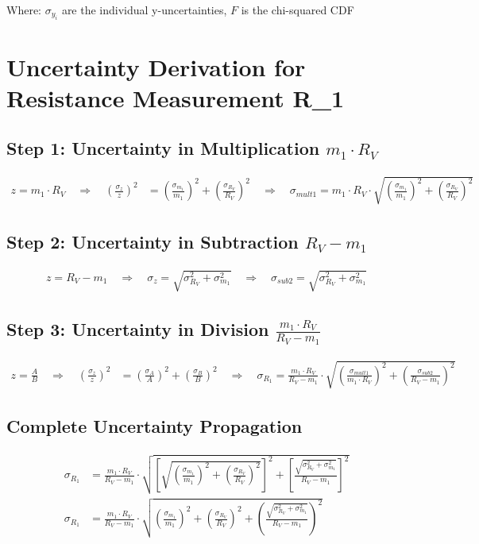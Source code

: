 \documentclass{article} %
\begin{document}
Where: $\sigma_{y_i}$ are the individual y-uncertainties, $F$ is the chi-squared CDF

\newpage

\section{Uncertainty Derivation for Resistance Measurement R\_1}
\label{app:d_R1_uncertainty}

\subsection*{Step 1: Uncertainty in Multiplication $m_1 \cdot R_V$}
\begin{align*}
z = m_1 \cdot R_V \quad \Rightarrow \quad \left(\frac{\sigma_z}{z}\right)^2 &= \left(\frac{\sigma_{m_1}}{m_1}\right)^2 + \left(\frac{\sigma_{R_V}}{R_V}\right)^2 \quad \Rightarrow \quad \sigma_{mult1} = m_1 \cdot R_V \cdot \sqrt{\left(\frac{\sigma_{m_1}}{m_1}\right)^2 + \left(\frac{\sigma_{R_V}}{R_V}\right)^2}
\end{align*}

\subsection*{Step 2: Uncertainty in Subtraction $R_V - m_1$}
\begin{align*}
z = R_V - m_1 \quad \Rightarrow \quad \sigma_z = \sqrt{\sigma_{R_V}^2 + \sigma_{m_1}^2} \quad \Rightarrow \quad \sigma_{sub2} = \sqrt{\sigma_{R_V}^2 + \sigma_{m_1}^2}
\end{align*}

\subsection*{Step 3: Uncertainty in Division $\frac{m_1 \cdot R_V}{R_V - m_1}$}
\begin{align*}
z = \frac{A}{B} \quad \Rightarrow \quad \left(\frac{\sigma_z}{z}\right)^2 &= \left(\frac{\sigma_A}{A}\right)^2 + \left(\frac{\sigma_B}{B}\right)^2 \quad \Rightarrow \quad \sigma_{R_1} = \frac{m_1 \cdot R_V}{R_V - m_1} \cdot \sqrt{\left(\frac{\sigma_{mult1}}{m_1 \cdot R_V}\right)^2 + \left(\frac{\sigma_{sub2}}{R_V - m_1}\right)^2}
\end{align*}

\subsection*{Complete Uncertainty Propagation}
\begin{align*}
\sigma_{R_1} &= \frac{m_1 \cdot R_V}{R_V - m_1} \cdot \sqrt{\left[\sqrt{\left(\frac{\sigma_{m_1}}{m_1}\right)^2 + \left(\frac{\sigma_{R_V}}{R_V}\right)^2}\right]^2 + \left[\frac{\sqrt{\sigma_{R_V}^2 + \sigma_{m_1}^2}}{R_V - m_1}\right]^2} \\
\sigma_{R_1} &= \frac{m_1 \cdot R_V}{R_V - m_1} \cdot \sqrt{\left(\frac{\sigma_{m_1}}{m_1}\right)^2 + \left(\frac{\sigma_{R_V}}{R_V}\right)^2 + \left(\frac{\sqrt{\sigma_{R_V}^2 + \sigma_{m_1}^2}}{R_V - m_1}\right)^2}
\end{align*}
\end{document}
